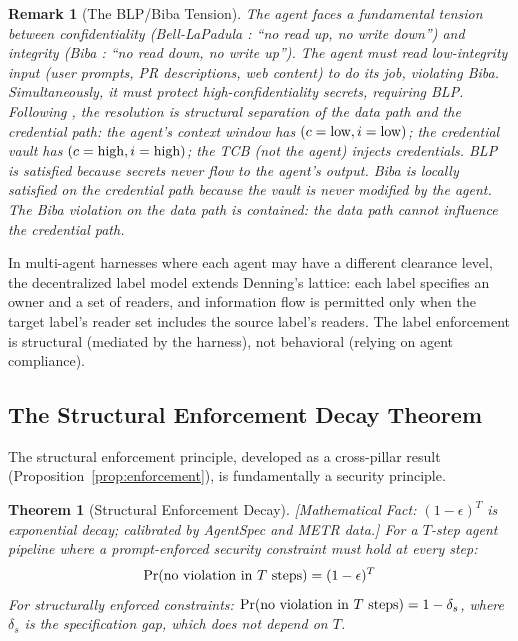 \documentclass[11pt, a4paper]{googledeepmind}
\newtheorem{theorem}{Theorem}[section]
\newtheorem*{remark}{Remark}
\begin{document}
\begin{remark}[The BLP/Biba Tension]
The agent faces a fundamental tension between confidentiality (Bell-LaPadula \citep{bell1973secure}: ``no read up, no write down'') and integrity (Biba \citep{biba1977integrity}: ``no read down, no write up''). The agent \emph{must} read low-integrity input (user prompts, PR descriptions, web content) to do its job, violating Biba. Simultaneously, it must protect high-confidentiality secrets, requiring BLP. Following \citet{lipner1982nondiscretionary}, the resolution is structural separation of the data path and the credential path: the agent's context window has $(c = \textup{low}, i = \textup{low})$; the credential vault has $(c = \textup{high}, i = \textup{high})$; the TCB (not the agent) injects credentials. BLP is satisfied because secrets never flow to the agent's output. Biba is locally satisfied on the credential path because the vault is never modified by the agent. The Biba violation on the data path is contained: the data path cannot influence the credential path.
\end{remark}

In multi-agent harnesses where each agent may have a different clearance level, the decentralized label model \citep{myers1997decentralized} extends Denning's lattice: each label specifies an owner and a set of readers, and information flow is permitted only when the target label's reader set includes the source label's readers. The label enforcement is structural (mediated by the harness), not behavioral (relying on agent compliance).

\subsection{The Structural Enforcement Decay Theorem}

The structural enforcement principle, developed as a cross-pillar result (Proposition~\ref{prop:enforcement}), is fundamentally a security principle.

\begin{theorem}[Structural Enforcement Decay]
\emph{[Mathematical Fact: $(1-\epsilon)^T$ is exponential decay; calibrated by AgentSpec and METR data.]}
\label{thm:sec-decay}
For a $T$-step agent pipeline where a prompt-enforced security constraint must hold at every step:
\begin{equation}
\Pr(\textup{no violation in } T \textup{ steps}) = (1-\epsilon)^T
\end{equation}
For structurally enforced constraints: $\Pr(\textup{no violation in } T \textup{ steps}) = 1 - \delta_s$, where $\delta_s$ is the specification gap, which does not depend on $T$.
\end{theorem}
\end{document}
